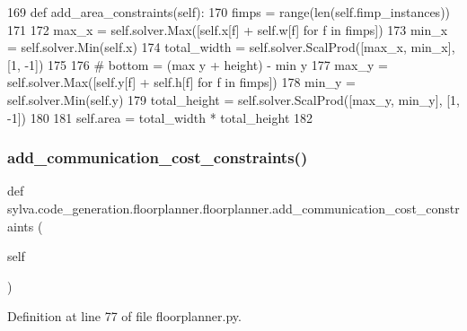\begin{DoxyCode}
169     \textcolor{keyword}{def }add\_area\_constraints(self):
170         fimps = range(len(self.fimp\_instances))
171 
172         max\_x = self.solver.Max([self.x[f] + self.w[f] \textcolor{keywordflow}{for} f \textcolor{keywordflow}{in} fimps])
173         min\_x = self.solver.Min(self.x)
174         total\_width = self.solver.ScalProd([max\_x, min\_x], [1, -1])
175 
176         \textcolor{comment}{# bottom = (max y + height) - min y}
177         max\_y = self.solver.Max([self.y[f] + self.h[f] \textcolor{keywordflow}{for} f \textcolor{keywordflow}{in} fimps])
178         min\_y = self.solver.Min(self.y)
179         total\_height = self.solver.ScalProd([max\_y, min\_y], [1, -1])
180 
181         self.area = total\_width * total\_height
182 
\end{DoxyCode}
\mbox{\label{classsylva_1_1code__generation_1_1floorplanner_1_1floorplanner_a8fa40b80a9a8bed617cb297758c0c5b5}} 
\subsubsection{\texorpdfstring{add\+\_\+communication\+\_\+cost\+\_\+constraints()}{add\_communication\_cost\_constraints()}}
{\footnotesize\ttfamily def sylva.\+code\+\_\+generation.\+floorplanner.\+floorplanner.\+add\+\_\+communication\+\_\+cost\+\_\+constraints (\begin{DoxyParamCaption}\item[{}]{self }\end{DoxyParamCaption})}



Definition at line 77 of file floorplanner.\+py.


